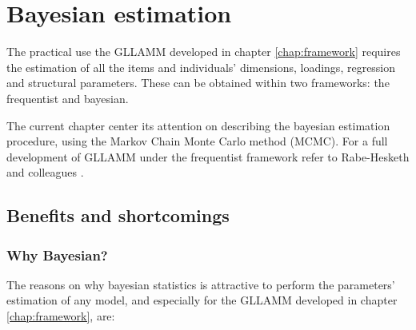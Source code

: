 \chapter{Bayesian estimation } \label{chap:estimation}

The practical use the GLLAMM developed in chapter \ref{chap:framework} requires the estimation of all the items and individuals' dimensions, loadings, regression and structural parameters. These can be obtained within two frameworks: the frequentist and bayesian. 

The current chapter center its attention on describing the bayesian estimation procedure, using the Markov Chain Monte Carlo method (MCMC). For a full development of GLLAMM under the frequentist framework refer to Rabe-Hesketh and colleagues \cite{Rabe_et_al_2004a, Rabe_et_al_2004b, Skrondal_et_al_2004a, Rabe_et_al_2012}.


\section{Benefits and shortcomings}

\subsection{Why Bayesian?} \label{sub_sect:goods}

The reasons on why bayesian statistics is attractive to perform the parameters' estimation of any model, and especially for the GLLAMM developed in chapter \ref{chap:framework}, are:

